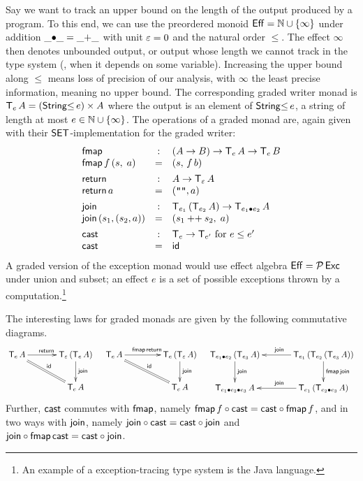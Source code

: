 \documentclass[acmsmall,review,anonymous]{acmart}\settopmatter{printfolios=true,printccs=false,printacmref=false}
\begin{document}
Say we want to track an upper bound on the length of the output
produced by a program.  To this end, we can use the preordered monoid
$\Eff = \bN \cup \{\infty\}$ under addition $\_{\bu}\_ = \_{+}\_$
with unit $\Ge = 0$ and the
natural order $\leq$.  The effect $\infty$ then denotes unbounded output, or
output whose length we cannot track in the type system (\eg, when it
depends on some variable).  Increasing the upper bound along $\leq$
means loss of precision of our analysis, with $\infty$ the least
precise information, meaning no upper bound.  The corresponding graded
writer monad is $\T[e]\,A = (\StringLe e) \times A$ where the output is an
element of $\StringLe e$, a string of length at most $e \in \bN \cup
\{\infty\}$.  The operations of a graded monad are, again given with
their $\SET$-implementation for the graded writer:
\[
\begin{array}{lcl}
\tfmap & : & (A \to B) \to \T[e]\,A \to \T[e]\,B \\
\tfmap\, f\, (s,\; a) & = & (s,\, f\, b)
\\[1ex]
\treturn & : & A \to \T[\Ge]\,A \\
\treturn\, a & = & (\verb|""|, a)
\\[1ex]
\tjoin & : & \T[e_1]\,(\T[e_2]\,A) \to \T[e_1 \bu e_2]\,A \\
\tjoin\,(s_1,(s_2,a)) & = & (s_1 \append s_2,\; a)
\\[1ex]
\tcast & : & \T[e] \to \T[e'] \mbox{ for } e \leq e'\\
\tcast & = & \tid \\
\end{array}
\]
A graded version of the exception monad would use effect algebra
$\Eff = \Pot\Exc$ under union and subset; an effect $e$ is a set of
possible exceptions thrown by a computation.\footnote{An example of a
  exception-tracing type system is the Java language.}

The interesting laws for graded monads are given by the following
commutative diagrams.
\[
\xymatrix@C=8ex{
  \T[e]\,A     \ar[r]^{\treturn} \ar@{=}[dr]^{\tid}
& \T[\Ge]\,(\T[e]\,A) \ar[d]^{\tjoin}
\\
& \T[e]\,A
}
\quad
\xymatrix@C=10ex{
  \T[e]\,A     \ar[r]^{\tfmap\,\treturn} \ar@{=}[dr]^{\tid}
& \T[e]\,(\T[\Ge]\,A) \ar[d]^{\tjoin}
\\
& \T[e]\,A
}
\quad
\xymatrix@C=8ex{
  \T[e_1 \bu e_2]\,(\T[e_3]\,A) \ar[d]^{\tjoin}
& \T[e_1]\,(\T[e_2]\,(\T[e_3]\,A)) \ar[l]_{\tjoin} \ar[d]^{\tfmap\,\tjoin}
\\
  \T[e_1 \bu e_2 \bu e_3]\,A
& \T[e_1]\,(\T[e_2 \bu e_3]\,A) \ar[l]_{\tjoin}
}
\]
Further, $\tcast$ commutes with $\tfmap$, namely $\tfmap\,f \circ
\tcast = \tcast \circ \tfmap\,f$, and in two ways with $\tjoin$, namely
$\tjoin \circ \tcast = \tcast \circ \tjoin$ and $\tjoin
\circ \tfmap\,\tcast = \tcast \circ \tjoin$.
\end{document}
